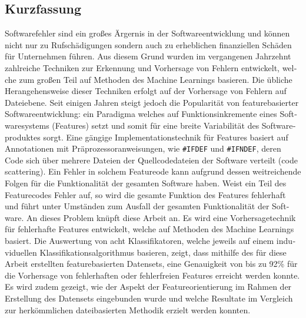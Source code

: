 
\begin{otherlanguage}{ngerman}
    \section*{Kurzfassung}

Softwarefehler sind ein großes Ärgernis in der Softwareentwicklung und können nicht nur zu Rufschädigungen sondern auch zu erheblichen finanziellen Schäden für Unternehmen führen. Aus diesem Grund wurden im vergangenen Jahrzehnt zahlreiche Techniken zur Erkennung und Vorhersage von Fehlern entwickelt, welche zum großen Teil auf Methoden des Machine Learnings basieren. Die übliche Herangehensweise dieser Techniken erfolgt auf der Vorhersage von Fehlern auf Dateiebene. Seit einigen Jahren steigt jedoch die Popularität von featurebasierter Softwareentwicklung: ein Paradigma welches auf Funktionsinkremente eines Softwaresystems (Features) setzt und somit für eine breite Variabilität des Softwareproduktes sorgt. Eine gängige Implementationstechnik für Features basiert auf Annotationen mit Präprozessoranweisungen, wie \texttt{\#IFDEF} und \texttt{\#IFNDEF}, deren Code sich über mehrere Dateien der Quellcodedateien der Software verteilt (\glqq code scattering)\grqq. Ein Fehler in solchem Featureode kann aufgrund dessen weitreichende Folgen für die Funktionalität der gesamten Software haben. Weist ein Teil des Featurecodes Fehler auf, so wird die gesamte Funktion des Features fehlerhaft und führt unter Umständen zum Ausfall der gesamten Funktionalität der Software. An dieses Problem knüpft diese Arbeit an. Es wird eine Vorhersagetechnik für fehlerhafte Features entwickelt, welche auf Methoden des Machine Learnings basiert. Die Auswertung von acht Klassifikatoren, welche jeweils auf einem induviduellen Klassifikationsalgorithmus basieren, zeigt, dass mithilfe des für diese Arbeit erstellten featurebasierten Datensets, eine Genauigkeit von bis zu 92\% für die Vorhersage von fehlerhaften oder fehlerfreien Features erreicht werden konnte. Es wird zudem gezeigt, wie der Aspekt der Featureorientierung im Rahmen der Erstellung des Datensets eingebunden wurde und welche Resultate im Vergleich zur herkömmlichen dateibasierten Methodik erzielt werden konnten.

\end{otherlanguage}

